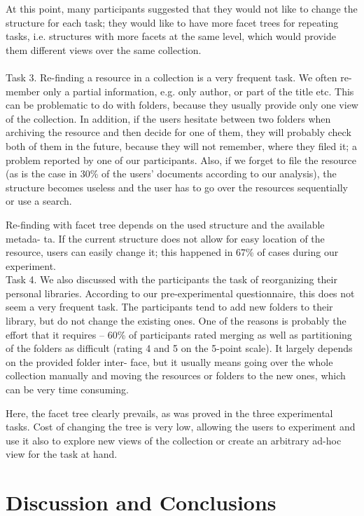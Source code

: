 \documentclass{llncs}
\begin{document}
At this point, many participants suggested that they would not like to change the structure for each task; they would like to have more facet trees for repeating tasks, i.e. structures with more facets at the same level, which would provide them different views over the same collection.
\\ \\
Task 3. Re-finding a resource in a collection is a very frequent task. We often re- member only a partial information, e.g. only author, or part of the title etc. This can be problematic to do with folders, because they usually provide only one view of the collection. In addition, if the users hesitate between two folders when archiving the resource and then decide for one of them, they will probably check both of them in the future, because they will not remember, where they filed it; a problem reported by one of our participants. Also, if we forget to file the resource (as is the case in 30\% of the users’ documents according to our analysis), the structure becomes useless and the user has to go over the resources sequentially or use a search.

Re-finding with facet tree depends on the used structure and the available metada- ta. If the current structure does not allow for easy location of the resource, users can easily change it; this happened in 67\% of cases during our experiment.
\\
Task 4. We also discussed with the participants the task of reorganizing their personal libraries. According to our pre-experimental questionnaire, this does not seem a very frequent task. The participants tend to add new folders to their library, but do not change the existing ones. One of the reasons is probably the effort that it requires – 60\% of participants rated merging as well as partitioning of the folders as difficult (rating 4 and 5 on the 5-point scale). It largely depends on the provided folder inter- face, but it usually means going over the whole collection manually and moving the resources or folders to the new ones, which can be very time consuming.

Here, the facet tree clearly prevails, as was proved in the three experimental tasks. Cost of changing the tree is very low, allowing the users to experiment and use it also to explore new views of the collection or create an arbitrary ad-hoc view for the task at hand.

\section{Discussion and Conclusions}
\end{document}
